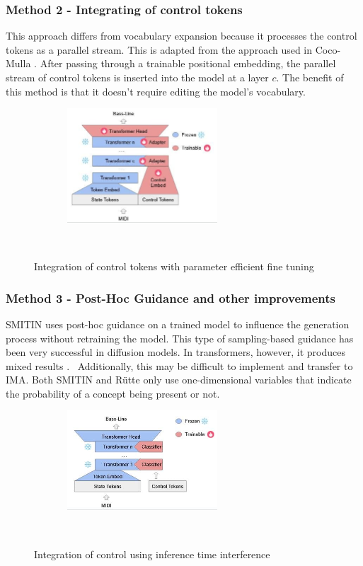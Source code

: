 \subsubsection{Method 2 - Integrating of control tokens} 

This approach differs from vocabulary expansion because it processes the control tokens as a parallel stream. This is adapted from the approach used in Coco-Mulla \cite{Lin_cocomulla_2024}. After passing through a trainable positional embedding, the parallel stream of control tokens is inserted into the model at a layer $c$. The benefit of this method is that it doesn't require editing the model's vocabulary. 
 
\begin{figure}[H]
    \centering
    \includegraphics[width=0.5\textwidth]{IMAGES/ControlTokensLora.jpg} 
    \caption{Integration of control tokens with parameter efficient fine tuning}
    \label{fig:controltok}
\end{figure}

\subsubsection{Method 3 - Post-Hoc Guidance and other improvements}

SMITIN\cite{Koo_Wichern_Germain_SMITIN_2024} uses post-hoc guidance on a trained model to influence the generation process without retraining the model. This type of sampling-based guidance has been very successful in diffusion models. In transformers, however, it produces mixed results \cite{language_guide_rutte_2024}.  Additionally, this may be difficult to implement and transfer to IMA. Both SMITIN and Rütte\cite{language_guide_rutte_2024} only use one-dimensional variables that indicate the probability of a concept being present or not. 

\begin{figure}[H]
    \centering
    \includegraphics[width=0.5\textwidth]{IMAGES/adhoccontrol.jpg} 
    \caption{Integration of control using inference time interference}
    \label{fig:adhoccontrol}
\end{figure}

